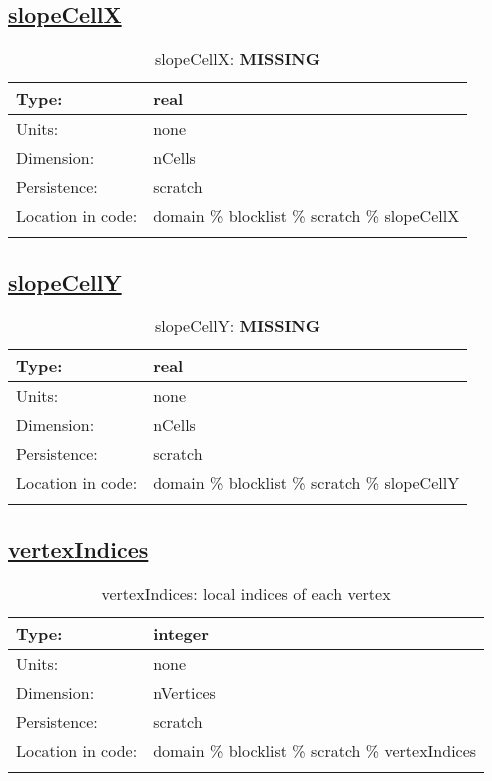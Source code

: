 \subsection[slopeCellX]{\hyperref[sec:var_tab_scratch]{slopeCellX}}
\label{subsec:var_sec_scratch_slopeCellX}
\begin{center}
\begin{longtable}{| p{2.0in} | p{4.0in} |}
        \hline 
        Type: & real \\
        \hline 
        Units: & \si{none} \\
        \hline 
        Dimension: & nCells \\
        \hline 
        Persistence: & scratch \\
        \hline 
         Location in code: & domain \% blocklist \% scratch \% slopeCellX \\
         \hline 
    \caption{slopeCellX: {\bf \color{red} MISSING}}
\end{longtable}
\end{center}
\subsection[slopeCellY]{\hyperref[sec:var_tab_scratch]{slopeCellY}}
\label{subsec:var_sec_scratch_slopeCellY}
\begin{center}
\begin{longtable}{| p{2.0in} | p{4.0in} |}
        \hline 
        Type: & real \\
        \hline 
        Units: & \si{none} \\
        \hline 
        Dimension: & nCells \\
        \hline 
        Persistence: & scratch \\
        \hline 
         Location in code: & domain \% blocklist \% scratch \% slopeCellY \\
         \hline 
    \caption{slopeCellY: {\bf \color{red} MISSING}}
\end{longtable}
\end{center}
\subsection[vertexIndices]{\hyperref[sec:var_tab_scratch]{vertexIndices}}
\label{subsec:var_sec_scratch_vertexIndices}
\begin{center}
\begin{longtable}{| p{2.0in} | p{4.0in} |}
        \hline 
        Type: & integer \\
        \hline 
        Units: & \si{none} \\
        \hline 
        Dimension: & nVertices \\
        \hline 
        Persistence: & scratch \\
        \hline 
         Location in code: & domain \% blocklist \% scratch \% vertexIndices \\
         \hline 
    \caption{vertexIndices: local indices of each vertex}
\end{longtable}
\end{center}
